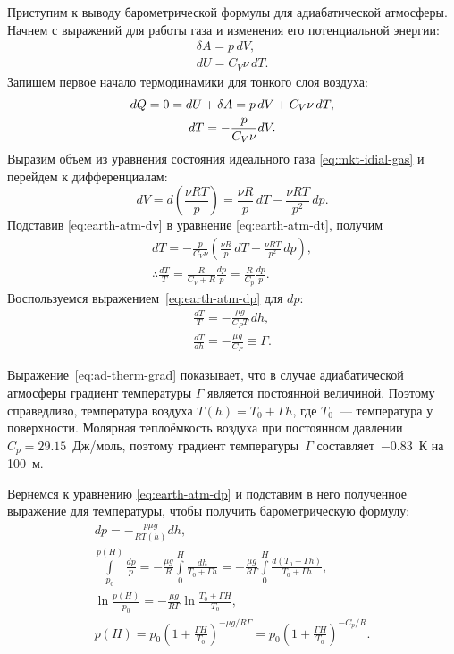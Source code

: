 Приступим к выводу барометрической формулы для адиабатической атмосферы. Начнем с выражений для работы газа и изменения его потенциальной энергии:
\begin{gather*}
    \delta A = p \,d V,\\
    dU = C_V \nu \,d T.
\end{gather*}
Запишем первое начало термодинамики для тонкого слоя воздуха:
\begin{gather}
    dQ = 0 = dU + \delta A = p \,d V + C_V \nu \,d T,\notag\\
    dT = - \frac{p}{C_V \nu} dV.
    \label{eq:earth-atm-dt}
\end{gather}
Выразим объем из уравнения состояния идеального газа \eqref{eq:mkt-idial-gas} и перейдем к дифференциалам:
\begin{equation}
    dV = d \left(\frac{\nu R T}{p} \right) = \frac{\nu R}{p} \,d T - \frac{\nu R T}{p^2} \,d p.
    \label{eq:earth-atm-dv}
\end{equation}
Подставив \eqref{eq:earth-atm-dv} в уравнение \eqref{eq:earth-atm-dt}, получим
\begin{gather*}
    dT = - \frac{p}{C_V \nu} \left( \frac{\nu R}{p} \,d T - \frac{\nu R T}{p^2} \,d p \right),\\
    \therefore \frac{dT}{T} = \frac{R}{C_V + R} \frac{dp}{p} = \frac{R}{C_p} \frac{dp}{p}.
\end{gather*}
Воспользуемся выражением~\eqref{eq:earth-atm-dp} для $dp$:
\begin{gather}
    \frac{d T}{T} = -\frac{\mu g}{C_P T} \,d h,\\
    \frac{dT}{dh} =  -\frac{\mu g}{C_P} \equiv \Gamma.\label{eq:ad-therm-grad}
\end{gather}

Выражение~\eqref{eq:ad-therm-grad} показывает, что в случае адиабатической атмосферы градиент температуры $\Gamma$ является постоянной величиной. Поэтому справедливо, температура воздуха $T(h) = T_0 + \Gamma h$, где $T_0$~--- температура у поверхности. Молярная теплоёмкость воздуха при постоянном давлении $C_p = 29.15$~Дж/моль, поэтому градиент температуры~$\Gamma$ составляет~$-0.83$~К на 100~м. 

Вернемся к уравнению \eqref{eq:earth-atm-dp} и подставим в него полученное выражение для температуры, чтобы получить барометрическую формулу:
\begin{gather*}
    dp = - \frac{p \mu g}{RT(h)} dh,\\
    \int\limits_{p_0}^{p(H)} \frac{dp}{p} = - \frac{\mu g}{R} \int\limits_0^H \frac{dh}{T_0 + \Gamma h}= - \frac{\mu g}{R\Gamma} \int\limits_0^H \frac{d(T_0 + \Gamma h)}{T_0 + \Gamma h},\\
    \ln \frac{p(H)}{p_0} = - \frac{\mu g}{R\Gamma} \ln \frac{T_0 + \Gamma H}{T_0},\\
    p(H) = p_0 \left(1 + \frac{\Gamma H}{T_0} \right)^{ - \mu g /R\Gamma} =  p_0 \left(1 + \frac{\Gamma H}{T_0} \right)^{ - C_p/R}.
\end{gather*}


